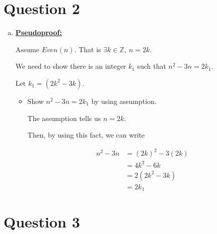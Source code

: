 \documentclass[12pt]{article}
\begin{document}
\section*{Question 2}
\begin{enumerate}[a.]
    \item


    \bigskip

    \begin{mdframed}
        \underline{\textbf{Pseudoproof:}}

        \bigskip

        Assume $Even(n)$. That is $\exists k \in \mathbb{Z},\:n = 2k$.

        \bigskip

        We need to show there is an integer $k_1$ such that $n^2 - 3n = 2k_1$.

        \bigskip

        Let $k_1 = (2k^2 - 3k)$.

        \bigskip

        \begin{itemize}
            \item Show $n^2 - 3n = 2k_1$ by using assumption.

            \bigskip

            \begin{mdframed}
            The assumption tells us $n = 2k$.

            \bigskip

            Then, by using this fact, we can write

            \begin{align}
                n^2 - 3n &= (2k)^2 - 3(2k)\\
                &= 4k^2 - 6k\\
                &= 2(2k^2 - 3k)\\
                &= 2k_1
            \end{align}
            \end{mdframed}

        \end{itemize}

    \end{mdframed}
\end{enumerate}

\section*{Question 3}
\end{document}
